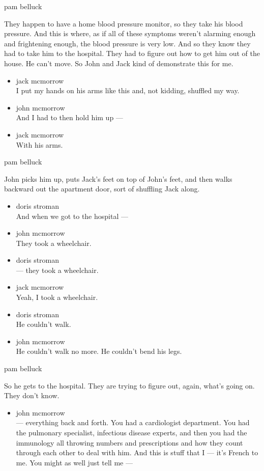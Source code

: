 pam belluck

They happen to have a home blood pressure monitor, so they take his
blood pressure. And this is where, as if all of these symptoms weren't
alarming enough and frightening enough, the blood pressure is very low.
And so they know they had to take him to the hospital. They had to
figure out how to get him out of the house. He can't move. So John and
Jack kind of demonstrate this for me.

\begin{itemize}
\item
  jack mcmorrow\\
  I put my hands on his arms like this and, not kidding, shuffled my
  way.
\item
  john mcmorrow\\
  And I had to then hold him up ---
\item
  jack mcmorrow\\
  With his arms.
\end{itemize}

pam belluck

John picks him up, puts Jack's feet on top of John's feet, and then
walks backward out the apartment door, sort of shuffling Jack along.

\begin{itemize}
\item
  doris stroman\\
  And when we got to the hospital ---
\item
  john mcmorrow\\
  They took a wheelchair.
\item
  doris stroman\\
  --- they took a wheelchair.
\item
  jack mcmorrow\\
  Yeah, I took a wheelchair.
\item
  doris stroman\\
  He couldn't walk.
\item
  john mcmorrow\\
  He couldn't walk no more. He couldn't bend his legs.
\end{itemize}

pam belluck

So he gets to the hospital. They are trying to figure out, again, what's
going on. They don't know.

\begin{itemize}
\tightlist
\item
  john mcmorrow\\
  --- everything back and forth. You had a cardiologist department. You
  had the pulmonary specialist, infectious disease experts, and then you
  had the immunology all throwing numbers and prescriptions and how they
  count through each other to deal with him. And this is stuff that I
  --- it's French to me. You might as well just tell me ---
\end{itemize}

